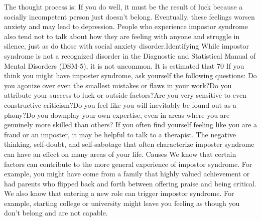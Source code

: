 \documentclass[14pt,a4paper]{extarticle}
\begin{document}
The thought process is: If you do well, it must be the result of luck because a socially incompetent person just doesn't belong.
\newline\newline 
Eventually, these feelings worsen anxiety and may lead to depression. People who experience impostor syndrome also tend not to talk about how they are feeling with anyone and struggle in silence, just as do those with social anxiety disorder.\newline\newline  Identifying \newline\newline 
While impostor syndrome is not a recognized disorder in the Diagnostic and Statistical Manual of Mental Disorders (DSM-5), it is not uncommon. It is estimated that 70%
\newline\newline 
If you think you might have imposter syndrome, ask yourself the following questions:
\newline\newline 
Do you agonize over even the smallest mistakes or flaws in your work?Do you attribute your success to luck or outside factors?Are you very sensitive to even constructive criticism?Do you feel like you will inevitably be found out as a phony?Do you downplay your own expertise, even in areas where you are genuinely more skilled than others?
\newline\newline 
If you often find yourself feeling like you are a fraud or an imposter, it may be helpful to talk to a therapist. The negative thinking, self-doubt, and self-sabotage that often characterize imposter syndrome can have an effect on many areas of your life.
\newline\newline  Causes \newline\newline 
We know that certain factors can contribute to the more general experience of impostor syndrome. For example, you might have come from a family that highly valued achievement or had parents who flipped back and forth between offering praise and being critical.
\newline\newline 
We also know that entering a new role can trigger impostor syndrome. For example, starting college or university might leave you feeling as though you don't belong and are not capable.
\end{document}
